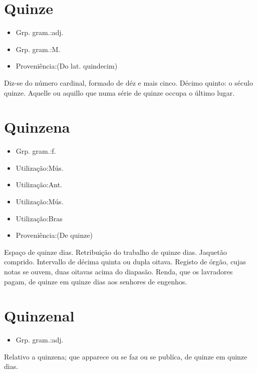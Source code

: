 \section{Quinze}
\begin{itemize}
\item {Grp. gram.:adj.}
\end{itemize}
\begin{itemize}
\item {Grp. gram.:M.}
\end{itemize}
\begin{itemize}
\item {Proveniência:(Do lat. \textunderscore quindecim\textunderscore )}
\end{itemize}
Diz-se do número cardinal, formado de déz e mais cinco.
Décimo quinto: \textunderscore o século quinze\textunderscore .
Aquelle ou aquillo que numa série de quinze occupa o último lugar.
\section{Quinzena}
\begin{itemize}
\item {Grp. gram.:f.}
\end{itemize}
\begin{itemize}
\item {Utilização:Mús.}
\end{itemize}
\begin{itemize}
\item {Utilização:Ant.}
\end{itemize}
\begin{itemize}
\item {Utilização:Mús.}
\end{itemize}
\begin{itemize}
\item {Utilização:Bras}
\end{itemize}
\begin{itemize}
\item {Proveniência:(De \textunderscore quinze\textunderscore )}
\end{itemize}
Espaço de quinze dias.
Retribuição do trabalho de quinze dias.
Jaquetão comprido.
Intervallo de décima quinta ou dupla oitava.
Registo de órgão, cujas notas se ouvem, duas oitavas acima do diapasão.
Renda, que os lavradores pagam, de quinze em quinze dias aos senhores de engenhos.
\section{Quinzenal}
\begin{itemize}
\item {Grp. gram.:adj.}
\end{itemize}
Relativo a quinzena; que apparece ou se faz ou se publíca, de quinze em quinze dias.
